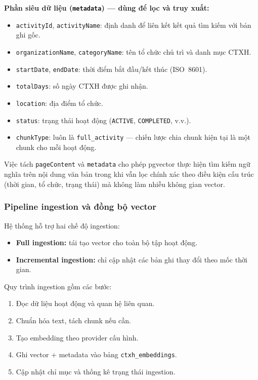 \textbf{Phần siêu dữ liệu (\texttt{metadata}) — dùng để lọc và truy xuất:}
\begin{itemize}
	\item \texttt{activityId}, \texttt{activityName}: định danh để liên kết kết quả tìm kiếm với bản ghi gốc.
	\item \texttt{organizationName}, \texttt{categoryName}: tên tổ chức chủ trì và danh mục CTXH.
	\item \texttt{startDate}, \texttt{endDate}: thời điểm bắt đầu/kết thúc (ISO~8601).
	\item \texttt{totalDays}: số ngày CTXH được ghi nhận.
	\item \texttt{location}: địa điểm tổ chức.
	\item \texttt{status}: trạng thái hoạt động (\texttt{ACTIVE}, \texttt{COMPLETED}, v.v.).
	\item \texttt{chunkType}: luôn là \texttt{full\_activity} — chiến lược chia chunk hiện tại là một chunk cho mỗi hoạt động.
\end{itemize}

Việc tách \texttt{pageContent} và \texttt{metadata} cho phép pgvector thực hiện tìm kiếm ngữ nghĩa trên nội dung văn bản trong khi vẫn lọc chính xác theo điều kiện cấu trúc (thời gian, tổ chức, trạng thái) mà không làm nhiễu không gian vector.

\subsubsection{Pipeline ingestion và đồng bộ vector}
Hệ thống hỗ trợ hai chế độ ingestion:
\begin{itemize}
	\item \textbf{Full ingestion:} tái tạo vector cho toàn bộ tập hoạt động.
	\item \textbf{Incremental ingestion:} chỉ cập nhật các bản ghi thay đổi theo mốc thời gian.
\end{itemize}

Quy trình ingestion gồm các bước:
\begin{enumerate}
	\item Đọc dữ liệu hoạt động và quan hệ liên quan.
	\item Chuẩn hóa text, tách chunk nếu cần.
	\item Tạo embedding theo provider cấu hình.
	\item Ghi vector + metadata vào bảng \texttt{ctxh\_embeddings}.
	\item Cập nhật chỉ mục và thống kê trạng thái ingestion.
\end{enumerate}

